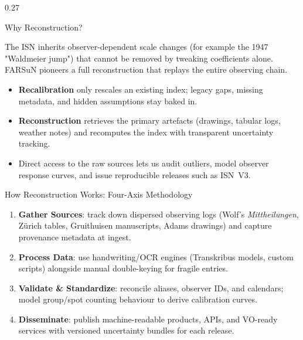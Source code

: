 \documentclass[final]{beamer}
\newcommand{\key}[1]{\textbf{\color{accent}#1}}
\newcommand{\callout}[2]{%
  \begin{beamercolorbox}[wd=\linewidth,sep=0.6em,rounded=true,shadow=false]{block body}%
    {\bfseries\color{royal}#1}\\[-0.3em]
    {\footnotesize #2}%
  \end{beamercolorbox}%
}
\newenvironment{tightblock}[1]{%
  \begin{block}{#1}\vspace{0.35em}
}{\end{block}}
\begin{document}
\begin{frame}[t]
\begin{columns}[t,totalwidth=0.98\paperwidth]
\begin{column}{0.27\paperwidth}
\begin{tightblock}{Why Reconstruction?}
  The ISN inherits observer-dependent scale changes (for example the 1947 "Waldmeier jump") that cannot be removed by tweaking coefficients alone. FARSuN pioneers a full reconstruction that replays the entire observing chain.
\begin{itemize}
  \item \textbf{Recalibration} only rescales an existing index; legacy gaps, missing metadata, and hidden assumptions stay baked in.
  \item \textbf{Reconstruction} retrieves the primary artefacts (drawings, tabular logs, weather notes) and recomputes the index with transparent uncertainty tracking.
  \item Direct access to the raw sources lets us audit outliers, model observer response curves, and issue reproducible releases such as ISN~V3.
\end{itemize}
\end{tightblock}


\begin{tightblock}{How Reconstruction Works: Four-Axis Methodology}
\begin{enumerate}
  \item \key{Gather Sources}: track down dispersed observing logs (Wolf's \emph{Mittheilungen}, Zürich tables, Gruithuisen manuscripts, Adams drawings) and capture provenance metadata at ingest.
  \item \key{Process Data}: use handwriting/OCR engines (Transkribus models, custom scripts) alongside manual double-keying for fragile entries.
  \item \key{Validate \& Standardize}: reconcile aliases, observer IDs, and calendars; model group/spot counting behaviour to derive calibration curves.
  \item \key{Disseminate}: publish machine-readable products, APIs, and VO-ready services with versioned uncertainty bundles for each release.
\end{enumerate}
\end{tightblock}


\end{column}
\end{columns}
\end{frame}
\end{document}
